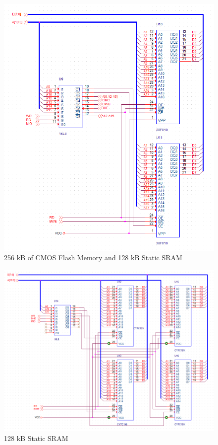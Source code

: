         \begin{figure}[ht]
            \begin{center}
                \includegraphics[width=1\textwidth]{figures/schematics/flash_mem.png}
                \caption{256 kB of CMOS Flash Memory and 128 kB Static SRAM} \label{fig:page3}
            \end{center}
        \end{figure}

        \begin{figure}[ht]
            \begin{center}
                \includegraphics[width=1\textwidth]{figures/schematics/sram.png}
                \caption{128 kB Static SRAM} \label{fig:page4}
            \end{center}
        \end{figure}

